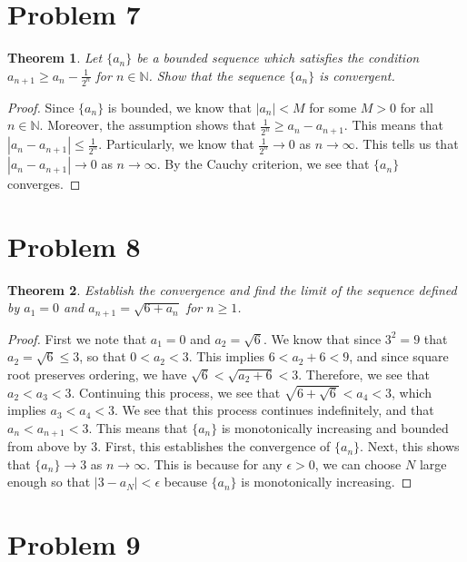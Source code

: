 \documentclass[psamsfonts]{amsart}
\newtheorem{thm}{Theorem}[section]
\theoremstyle{definition}
\theoremstyle{remark}
\numberwithin{equation}{section}
\begin{document}
\section{Problem 7}

\begin{thm}
Let $\{ a_n \}$ be a bounded sequence which satisfies the condition $a_{n+1} \geq a_n - \frac{1}{2^n}$ for $ n \in \mathbb{N}$. Show that the sequence $\{ a_n \}$ is convergent. 
\end{thm}

\begin{proof}
Since $\{a_n \}$ is bounded, we know that $|a_n | < M$ for some $M > 0$ for all $n \in \mathbb{N}$. Moreover, the assumption shows that $\frac{1}{2^n} \geq a_n - a_{n+1}$. This means that $|a_{n} - a_{n+1} | \leq \frac{1}{2^n}$. Particularly, we know that $\frac{1}{2^n} \rightarrow 0$ as $n \to \infty$. This tells us that $|a_{n} - a_{n+1}| \to 0$ as $n \to \infty$. By the Cauchy criterion, we see that $\{ a_n \}$ converges.  
\end{proof}

\section{Problem 8}

\begin{thm}
Establish the convergence and find the limit of the sequence defined by $a_1 = 0$ and $a_{n+1} = \sqrt{6 + a_n}$ for $n \geq 1$. 
\end{thm}

\begin{proof}
First we note that $a_1 = 0$ and $a_2 = \sqrt{6}$. We know that since $3^2 = 9$ that $a_2 = \sqrt{6} \leq 3$, so that $0 < a_2 < 3$. This implies $6 < a_2 + 6 < 9$, and since square root preserves ordering, we have $\sqrt{6} < \sqrt{a_2 + 6} < 3$. Therefore, we see that $a_2 < a_3 < 3$. Continuing this process, we see that $\sqrt{6 + \sqrt{6}} < a_4 < 3$, which implies $a_3 < a_4 < 3$. We see that this process continues indefinitely, and that $a_n < a_{n+1} < 3$. This means that $\{ a_n \}$ is monotonically increasing and bounded from above by 3. First, this establishes the convergence of $\{ a_n \}$. Next, this shows that $\{a_n \} \to 3$ as $ n \to \infty$. This is because for any $\epsilon > 0$, we can choose $N$ large enough so that $|3 - a_N | < \epsilon$ because $\{a_n \}$ is monotonically increasing. 
\end{proof}

\section{Problem 9}
\end{document}
